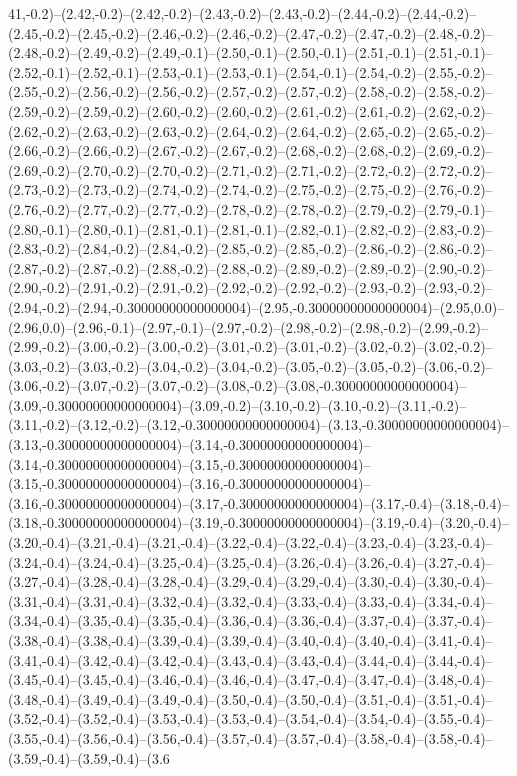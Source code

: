 41,-0.2)--(2.42,-0.2)--(2.42,-0.2)--(2.43,-0.2)--(2.43,-0.2)--(2.44,-0.2)--(2.44,-0.2)--(2.45,-0.2)--(2.45,-0.2)--(2.46,-0.2)--(2.46,-0.2)--(2.47,-0.2)--(2.47,-0.2)--(2.48,-0.2)--(2.48,-0.2)--(2.49,-0.2)--(2.49,-0.1)--(2.50,-0.1)--(2.50,-0.1)--(2.51,-0.1)--(2.51,-0.1)--(2.52,-0.1)--(2.52,-0.1)--(2.53,-0.1)--(2.53,-0.1)--(2.54,-0.1)--(2.54,-0.2)--(2.55,-0.2)--(2.55,-0.2)--(2.56,-0.2)--(2.56,-0.2)--(2.57,-0.2)--(2.57,-0.2)--(2.58,-0.2)--(2.58,-0.2)--(2.59,-0.2)--(2.59,-0.2)--(2.60,-0.2)--(2.60,-0.2)--(2.61,-0.2)--(2.61,-0.2)--(2.62,-0.2)--(2.62,-0.2)--(2.63,-0.2)--(2.63,-0.2)--(2.64,-0.2)--(2.64,-0.2)--(2.65,-0.2)--(2.65,-0.2)--(2.66,-0.2)--(2.66,-0.2)--(2.67,-0.2)--(2.67,-0.2)--(2.68,-0.2)--(2.68,-0.2)--(2.69,-0.2)--(2.69,-0.2)--(2.70,-0.2)--(2.70,-0.2)--(2.71,-0.2)--(2.71,-0.2)--(2.72,-0.2)--(2.72,-0.2)--(2.73,-0.2)--(2.73,-0.2)--(2.74,-0.2)--(2.74,-0.2)--(2.75,-0.2)--(2.75,-0.2)--(2.76,-0.2)--(2.76,-0.2)--(2.77,-0.2)--(2.77,-0.2)--(2.78,-0.2)--(2.78,-0.2)--(2.79,-0.2)--(2.79,-0.1)--(2.80,-0.1)--(2.80,-0.1)--(2.81,-0.1)--(2.81,-0.1)--(2.82,-0.1)--(2.82,-0.2)--(2.83,-0.2)--(2.83,-0.2)--(2.84,-0.2)--(2.84,-0.2)--(2.85,-0.2)--(2.85,-0.2)--(2.86,-0.2)--(2.86,-0.2)--(2.87,-0.2)--(2.87,-0.2)--(2.88,-0.2)--(2.88,-0.2)--(2.89,-0.2)--(2.89,-0.2)--(2.90,-0.2)--(2.90,-0.2)--(2.91,-0.2)--(2.91,-0.2)--(2.92,-0.2)--(2.92,-0.2)--(2.93,-0.2)--(2.93,-0.2)--(2.94,-0.2)--(2.94,-0.30000000000000004)--(2.95,-0.30000000000000004)--(2.95,0.0)--(2.96,0.0)--(2.96,-0.1)--(2.97,-0.1)--(2.97,-0.2)--(2.98,-0.2)--(2.98,-0.2)--(2.99,-0.2)--(2.99,-0.2)--(3.00,-0.2)--(3.00,-0.2)--(3.01,-0.2)--(3.01,-0.2)--(3.02,-0.2)--(3.02,-0.2)--(3.03,-0.2)--(3.03,-0.2)--(3.04,-0.2)--(3.04,-0.2)--(3.05,-0.2)--(3.05,-0.2)--(3.06,-0.2)--(3.06,-0.2)--(3.07,-0.2)--(3.07,-0.2)--(3.08,-0.2)--(3.08,-0.30000000000000004)--(3.09,-0.30000000000000004)--(3.09,-0.2)--(3.10,-0.2)--(3.10,-0.2)--(3.11,-0.2)--(3.11,-0.2)--(3.12,-0.2)--(3.12,-0.30000000000000004)--(3.13,-0.30000000000000004)--(3.13,-0.30000000000000004)--(3.14,-0.30000000000000004)--(3.14,-0.30000000000000004)--(3.15,-0.30000000000000004)--(3.15,-0.30000000000000004)--(3.16,-0.30000000000000004)--(3.16,-0.30000000000000004)--(3.17,-0.30000000000000004)--(3.17,-0.4)--(3.18,-0.4)--(3.18,-0.30000000000000004)--(3.19,-0.30000000000000004)--(3.19,-0.4)--(3.20,-0.4)--(3.20,-0.4)--(3.21,-0.4)--(3.21,-0.4)--(3.22,-0.4)--(3.22,-0.4)--(3.23,-0.4)--(3.23,-0.4)--(3.24,-0.4)--(3.24,-0.4)--(3.25,-0.4)--(3.25,-0.4)--(3.26,-0.4)--(3.26,-0.4)--(3.27,-0.4)--(3.27,-0.4)--(3.28,-0.4)--(3.28,-0.4)--(3.29,-0.4)--(3.29,-0.4)--(3.30,-0.4)--(3.30,-0.4)--(3.31,-0.4)--(3.31,-0.4)--(3.32,-0.4)--(3.32,-0.4)--(3.33,-0.4)--(3.33,-0.4)--(3.34,-0.4)--(3.34,-0.4)--(3.35,-0.4)--(3.35,-0.4)--(3.36,-0.4)--(3.36,-0.4)--(3.37,-0.4)--(3.37,-0.4)--(3.38,-0.4)--(3.38,-0.4)--(3.39,-0.4)--(3.39,-0.4)--(3.40,-0.4)--(3.40,-0.4)--(3.41,-0.4)--(3.41,-0.4)--(3.42,-0.4)--(3.42,-0.4)--(3.43,-0.4)--(3.43,-0.4)--(3.44,-0.4)--(3.44,-0.4)--(3.45,-0.4)--(3.45,-0.4)--(3.46,-0.4)--(3.46,-0.4)--(3.47,-0.4)--(3.47,-0.4)--(3.48,-0.4)--(3.48,-0.4)--(3.49,-0.4)--(3.49,-0.4)--(3.50,-0.4)--(3.50,-0.4)--(3.51,-0.4)--(3.51,-0.4)--(3.52,-0.4)--(3.52,-0.4)--(3.53,-0.4)--(3.53,-0.4)--(3.54,-0.4)--(3.54,-0.4)--(3.55,-0.4)--(3.55,-0.4)--(3.56,-0.4)--(3.56,-0.4)--(3.57,-0.4)--(3.57,-0.4)--(3.58,-0.4)--(3.58,-0.4)--(3.59,-0.4)--(3.59,-0.4)--(3.6